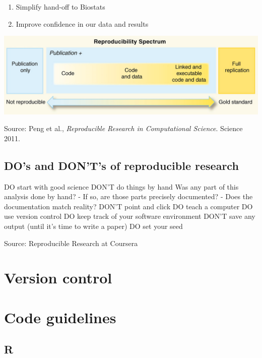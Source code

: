 \documentclass[]{book}
\begin{document}
\begin{enumerate}
\def\labelenumi{\arabic{enumi}.}
\setcounter{enumi}{1}
\item
  Simplify hand-off to Biostats
\item
  Improve confidence in our data and results
\end{enumerate}

\includegraphics{images/reprodresearch.jpg}

Source: Peng et al., \emph{Reproducible Research in Computational Science}. Science 2011.

\hypertarget{dos-and-donts-of-reproducible-research}{%
\subsection{DO's and DON'T's of reproducible research}\label{dos-and-donts-of-reproducible-research}}

{DO} start with good science
{DON'T} do things by hand
Was any part of this analysis done by hand?
- If so, are those parts precisely documented?
- Does the documentation match reality?
{DON'T} point and click
{DO} teach a computer
{DO} use version control
{DO} keep track of your software environment
{DON'T} save any output (until it's time to write a paper)
{DO} set your seed

Source: Reproducible Research at Coursera

\hypertarget{version-control}{%
\section{Version control}\label{version-control}}

\hypertarget{code-guidelines}{%
\section{Code guidelines}\label{code-guidelines}}

\hypertarget{r}{%
\subsection{R}\label{r}}
\end{document}

